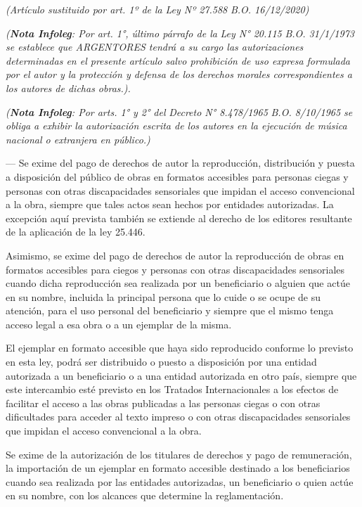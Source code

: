 \documentclass[10pt,a4paper]{article}
\makeatletter
\newcommand{\articulo}[3]{\par\if@nobreak\else\needspace{3\baselineskip}\fi\addvspace{5pt}%
  \phantomsection\addcontentsline{toc}{subsection}{#1}%
  \noindent{\color{azul}\bfseries #2} #3\par}
\newcommand{\nota}[1]{\par{\small\color{gris}#1\par}}
\makeatother
\begin{document}
\nota{\textit{(Artículo sustituido por art. 1º de la} \textit{Ley Nº 27.588} \textit{B.O. 16/12/2020)}}

\nota{\textit{(\textbf{Nota Infoleg}: Por art. 1°, último párrafo de la }\textit{Ley N° 20.115}\textit{ B.O. 31/1/1973 se establece que ARGENTORES tendrá a su cargo las autorizaciones determinadas en el presente artículo salvo prohibición de uso expresa formulada por el autor y la protección y defensa de los derechos morales correspondientes a los autores de dichas obras.).}}

\nota{\textit{(\textbf{Nota Infoleg}: Por arts. 1° y 2° del }\textit{Decreto N° 8.478/1965}\textit{ B.O. 8/10/1965 se obliga a exhibir la autorización escrita de los autores en la ejecución de música nacional o extranjera en público.)}}

\articulo{Art. 36 bis}{Art. 36 bis.}{— Se exime del pago de derechos de autor la reproducción, distribución y puesta a disposición del público de obras en formatos accesibles para personas ciegas y personas con otras discapacidades sensoriales que impidan el acceso convencional a la obra, siempre que tales actos sean hechos por entidades autorizadas. La excepción aquí prevista también se extiende al derecho de los editores resultante de la aplicación de la ley 25.446.}

Asimismo, se exime del pago de derechos de autor la reproducción de obras en formatos accesibles para ciegos y personas con otras discapacidades sensoriales cuando dicha reproducción sea realizada por un beneficiario o alguien que actúe en su nombre, incluida la principal persona que lo cuide o se ocupe de su atención, para el uso personal del beneficiario y siempre que el mismo tenga acceso legal a esa obra o a un ejemplar de la misma.

El ejemplar en formato accesible que haya sido reproducido conforme lo previsto en esta ley, podrá ser distribuido o puesto a disposición por una entidad autorizada a un beneficiario o a una entidad autorizada en otro país, siempre que este intercambio esté previsto en los Tratados Internacionales a los efectos de facilitar el acceso a las obras publicadas a las personas ciegas o con otras dificultades para acceder al texto impreso o con otras discapacidades sensoriales que impidan el acceso convencional a la obra.

Se exime de la autorización de los titulares de derechos y pago de remuneración, la importación de un ejemplar en formato accesible destinado a los beneficiarios cuando sea realizada por las entidades autorizadas, un beneficiario o quien actúe en su nombre, con los alcances que determine la reglamentación.
\end{document}
